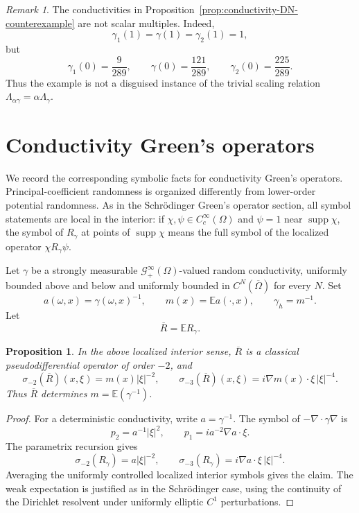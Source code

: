 \documentclass[11pt]{article}
\newcommand{\OmegaD}{\Omega}
\newcommand{\E}{\mathbb E}
\newcommand{\supp}{\operatorname{supp}}
\theoremstyle{plain}
\newtheorem{proposition}[theorem]{Proposition}
\theoremstyle{definition}
\theoremstyle{remark}
\newtheorem{remark}[theorem]{Remark}
\begin{document}
\begin{remark}
The conductivities in Proposition~\ref{prop:conductivity-DN-counterexample} are not scalar multiples.  Indeed,
\[
  \gamma_1(1)=\gamma(1)=\gamma_2(1)=1,
\]
but
\[
  \gamma_1(0)=\frac9{289},
  \qquad
  \gamma(0)=\frac{121}{289},
  \qquad
  \gamma_2(0)=\frac{225}{289}.
\]
Thus the example is not a disguised instance of the trivial scaling relation $\Lambda_{\alpha\gamma}=\alpha\Lambda_\gamma$.
\end{remark}

\section{Conductivity Green's operators}
\label{sec:conductivity-Green}

We record the corresponding symbolic facts for conductivity Green's operators.  Principal-coefficient randomness is organized differently from lower-order potential randomness.  As in the Schr\"odinger Green's operator section, all symbol statements are local in the interior: if $\chi,\psi\in C_c^\infty(\OmegaD)$ and $\psi=1$ near $\supp\chi$, the symbol of $R_\gamma$ at points of $\supp\chi$ means the full symbol of the localized operator $\chi R_\gamma\psi$.

Let $\gamma$ be a strongly measurable $\mathcal G_+^\infty(\OmegaD)$-valued random conductivity, uniformly bounded above and below and uniformly bounded in $C^N(\overline\OmegaD)$ for every $N$.  Set
\[
  a(\omega,x)=\gamma(\omega,x)^{-1},
  \qquad
  m(x)=\E a(\cdot,x),
  \qquad
  \gamma_h=m^{-1}.
\]
Let
\[
  \overline R=\E R_\gamma.
\]

\begin{proposition}\label{prop:conductivity-principal-symbol}
In the above localized interior sense, $\overline R$ is a classical pseudodifferential operator of order $-2$, and
\[
  \sigma_{-2}(\overline R)(x,\xi)=m(x)|\xi|^{-2},
  \qquad
  \sigma_{-3}(\overline R)(x,\xi)=i\nabla m(x)\cdot\xi\,|\xi|^{-4}.
\]
Thus $\overline R$ determines $m=\E(\gamma^{-1})$.
\end{proposition}

\begin{proof}
For a deterministic conductivity, write $a=\gamma^{-1}$.  The symbol of $-\nabla\cdot\gamma\nabla$ is
\[
  p_2=a^{-1}|\xi|^2,
  \qquad
  p_1=ia^{-2}\nabla a\cdot\xi.
\]
The parametrix recursion gives
\[
  \sigma_{-2}(R_\gamma)=a|\xi|^{-2},
  \qquad
  \sigma_{-3}(R_\gamma)=i\nabla a\cdot\xi\,|\xi|^{-4}.
\]
Averaging the uniformly controlled localized interior symbols gives the claim.  The weak expectation is justified as in the Schr\"odinger case, using the continuity of the Dirichlet resolvent under uniformly elliptic $C^1$ perturbations.
\end{proof}
\end{document}
